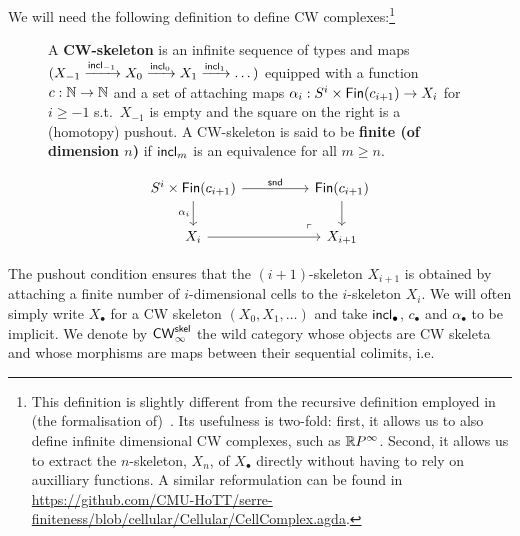 \documentclass[a4page]{article}
\begin{document}
We will need the following definition to define CW complexes:\footnote{This definition is slightly different from the
  recursive definition employed in (the formalisation
  of)~\cite{BuchholtzFavonia18}. Its usefulness is two-fold: first, it
  allows us to also define infinite dimensional CW complexes, such as
  $\textnormal{\ensuremath{\mathbb{R}P^\infty}}$. Second, it allows us to extract the $n$-skeleton,
  $X_n$, of $X_{\bullet}$ directly without having to rely on
  auxilliary functions. A similar reformulation can be found in \url{https://github.com/CMU-HoTT/serre-finiteness/blob/cellular/Cellular/CellComplex.agda}.}
%
\begin{figure}[H]
\begin{minipage}{0.65 \linewidth}
\begin{definition}
  A \textbf{CW-skeleton} is an infinite sequence of types and maps
  $(X_{-1} \xrightarrow{\textnormal{\ensuremath{\mathsf{incl}_{-1}}}} X_0 \xrightarrow{\textnormal{\ensuremath{\mathsf{incl}_{0}}}} X_1 \xrightarrow{\textnormal{\ensuremath{\mathsf{incl}_{1}}}} \dots )$
  equipped with a function $c : \textsf{$\mathbb{N}$} \to \textsf{$\mathbb{N}$}$ and a set of attaching maps $\alpha_i : S^i \times \textnormal{\ensuremath{\mathsf{Fin}({c_{i+1}})}} \to X_i$ for $i \geq -1$ s.t.\ $X_{-1}$ is empty and the square on the right is a (homotopy) pushout. A CW-skeleton is said to be \textbf{finite (of dimension $n$)} if $\textnormal{\ensuremath{\mathsf{incl}_{m}}}$ is
an equivalence for all $m \geq n$.
\end{definition}
\end{minipage}
\begin{minipage}{0.35 \linewidth}
  \[
\begin{tikzcd}[ampersand replacement=\&]
	{S^{i} \times \fin{c_{i+1}}} \&\& \fin{c_{i+1}} \\
	{X_i} \&\& {X_{i+1}}
	\arrow["{\mathsf{snd}}", from=1-1, to=1-3]
	\arrow["{\alpha_{i}}"', from=1-1, to=2-1]
	\arrow[from=2-1, to=2-3]
	\arrow[from=1-3, to=2-3]
	\arrow["\lrcorner"{anchor=center, pos=0.125, rotate=180}, draw=none, from=2-3, to=1-1]
\end{tikzcd}
\]
\end{minipage}
\end{figure}
%
The pushout condition ensures that the \( (i+1) \)-skeleton \( X_{i+1} \) is
obtained by attaching a finite number of \( i \)-dimensional cells to the
\( i \)-skeleton \( X_i \).
%
We will often simply write $X_\bullet$ for a CW skeleton $(X_0,X_1,\dots)$ and
take $\textnormal{\ensuremath{\mathsf{incl}_{\bullet}}}$, $c_{\bullet}$ and $ \alpha_{\bullet}$ to be implicit.
%
We denote by $\textnormal{\ensuremath{\mathsf{CW}_\infty^{\mathsf{skel}}}}$ the wild category whose objects are CW skeleta and
whose morphisms are maps between their sequential colimits, i.e.\
\end{document}
